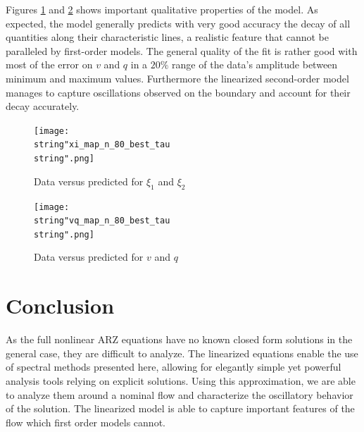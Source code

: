 \documentclass[a4paper, 10pt, conference]{ieeeconf}      %
\begin{document}
Figures \ref{fig:xi_1_xi_2_data_vs_sim} and \ref{fig:v_q_data_vs_sim} shows important qualitative properties of the model. As expected, the model generally predicts with very good accuracy the decay of all quantities along their characteristic lines, a realistic feature that cannot be paralleled by first-order models. The general quality of the fit is rather good with most of the error on $v$ and $q$ in a $20\%$ range of the data's amplitude between minimum and maximum values. Furthermore the linearized second-order model manages to capture oscillations observed on the boundary and account for their decay accurately.

\begin{figure}
\centering
\texttt{[image: \\string"xi\_map\_n\_80\_best\_tau\\string".png]}
\protect\caption{Data versus predicted for $\xi_1$ and $\xi_2$\label{fig:xi_1_xi_2_data_vs_sim}}
\end{figure}

\begin{figure}
\centering
\texttt{[image: \\string"vq\_map\_n\_80\_best\_tau\\string".png]}
\protect\caption{Data versus predicted for $v$ and $q$\label{fig:v_q_data_vs_sim}}
\end{figure}


\section{Conclusion}

As the full nonlinear ARZ equations have no known closed form solutions in the general case, they are difficult to analyze. The linearized equations enable the use of spectral methods presented here, allowing for elegantly simple yet powerful analysis tools relying on explicit solutions. Using this approximation, we are able to analyze them around a nominal flow and characterize the oscillatory behavior of the solution. The linearized model is able to capture important features of the flow which first order models cannot. 
\end{document}
